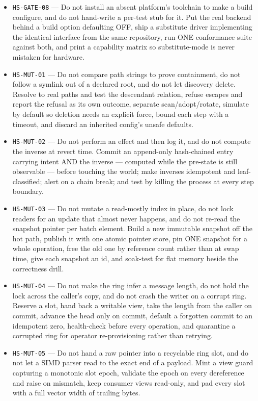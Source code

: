 \documentclass[11pt]{article}
\begin{document}
\begin{itemize}
  \item \texttt{HS-GATE-08} --- Do not install an absent platform's toolchain to make a build configure, and do not hand-write a per-test stub for it. Put the real backend behind a build option defaulting OFF, ship a substitute driver implementing the identical interface from the same repository, run ONE conformance suite against both, and print a capability matrix so substitute-mode is never mistaken for hardware. %
  \item \texttt{HS-MUT-01} --- Do not compare path strings to prove containment, do not follow a symlink out of a declared root, and do not let discovery delete. Resolve to real paths and test the descendant relation, refuse escapes and report the refusal as its own outcome, separate scan/adopt/rotate, simulate by default so deletion needs an explicit force, bound each step with a timeout, and discard an inherited config's unsafe defaults. %
  \item \texttt{HS-MUT-02} --- Do not perform an effect and then log it, and do not compute the inverse at revert time. Commit an append-only hash-chained entry carrying intent AND the inverse — computed while the pre-state is still observable — before touching the world; make inverses idempotent and leaf-classified; alert on a chain break; and test by killing the process at every step boundary. %
  \item \texttt{HS-MUT-03} --- Do not mutate a read-mostly index in place, do not lock readers for an update that almost never happens, and do not re-read the snapshot pointer per batch element. Build a new immutable snapshot off the hot path, publish it with one atomic pointer store, pin ONE snapshot for a whole operation, free the old one by reference count rather than at swap time, give each snapshot an id, and soak-test for flat memory beside the correctness drill. %
  \item \texttt{HS-MUT-04} --- Do not make the ring infer a message length, do not hold the lock across the caller's copy, and do not crash the writer on a corrupt ring. Reserve a slot, hand back a writable view, take the length from the caller on commit, advance the head only on commit, default a forgotten commit to an idempotent zero, health-check before every operation, and quarantine a corrupted ring for operator re-provisioning rather than retrying. %
  \item \texttt{HS-MUT-05} --- Do not hand a raw pointer into a recyclable ring slot, and do not let a SIMD parser read to the exact end of a payload. Mint a view guard capturing a monotonic slot epoch, validate the epoch on every dereference and raise on mismatch, keep consumer views read-only, and pad every slot with a full vector width of trailing bytes. %

\end{itemize}
\end{document}
